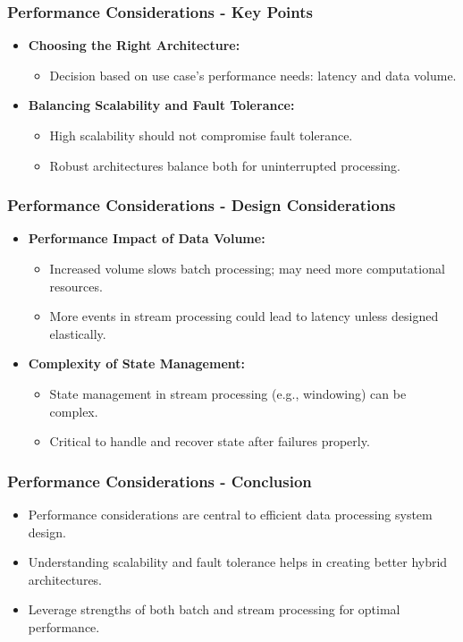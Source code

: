 \documentclass[aspectratio=169]{beamer}
\begin{document}
\begin{frame}[fragile]
  \frametitle{Performance Considerations - Key Points}
  \begin{itemize}
    \item \textbf{Choosing the Right Architecture:}
      \begin{itemize}
        \item Decision based on use case's performance needs: latency and data volume.
      \end{itemize}
    \item \textbf{Balancing Scalability and Fault Tolerance:}
      \begin{itemize}
        \item High scalability should not compromise fault tolerance.
        \item Robust architectures balance both for uninterrupted processing.
      \end{itemize}
  \end{itemize}
\end{frame}

\begin{frame}[fragile]
  \frametitle{Performance Considerations - Design Considerations}
  \begin{itemize}
    \item \textbf{Performance Impact of Data Volume:}
      \begin{itemize}
        \item Increased volume slows batch processing; may need more computational resources.
        \item More events in stream processing could lead to latency unless designed elastically.
      \end{itemize}
    \item \textbf{Complexity of State Management:}
      \begin{itemize}
        \item State management in stream processing (e.g., windowing) can be complex.
        \item Critical to handle and recover state after failures properly.
      \end{itemize}
  \end{itemize}
\end{frame}

\begin{frame}[fragile]
  \frametitle{Performance Considerations - Conclusion}
  \begin{itemize}
    \item Performance considerations are central to efficient data processing system design.
    \item Understanding scalability and fault tolerance helps in creating better hybrid architectures.
    \item Leverage strengths of both batch and stream processing for optimal performance.
  \end{itemize}
\end{frame}
\end{document}
